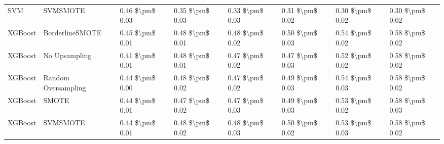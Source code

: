 \begin{tabular}{llllllll}
                            SVM &                      SVMSMOTE & 0.46 \$\textbackslash pm\$ 0.03 &           0.35 \$\textbackslash pm\$ 0.03 &       0.33 \$\textbackslash pm\$ 0.03 &        0.31 \$\textbackslash pm\$ 0.02 &                         0.30 \$\textbackslash pm\$ 0.02 &     0.30 \$\textbackslash pm\$ 0.02 \\
                        XGBoost &               BorderlineSMOTE & 0.45 \$\textbackslash pm\$ 0.01 &           0.48 \$\textbackslash pm\$ 0.01 &       0.48 \$\textbackslash pm\$ 0.02 &        0.50 \$\textbackslash pm\$ 0.03 &                         0.54 \$\textbackslash pm\$ 0.02 &     0.58 \$\textbackslash pm\$ 0.02 \\
                        XGBoost &                 No Upsampling & 0.41 \$\textbackslash pm\$ 0.01 &           0.48 \$\textbackslash pm\$ 0.01 &       0.47 \$\textbackslash pm\$ 0.02 &        0.47 \$\textbackslash pm\$ 0.03 &                         0.52 \$\textbackslash pm\$ 0.02 &     0.58 \$\textbackslash pm\$ 0.02 \\
                        XGBoost &           Random Oversampling & 0.44 \$\textbackslash pm\$ 0.00 &           0.48 \$\textbackslash pm\$ 0.02 &       0.47 \$\textbackslash pm\$ 0.02 &        0.49 \$\textbackslash pm\$ 0.03 &                         0.54 \$\textbackslash pm\$ 0.03 &     0.58 \$\textbackslash pm\$ 0.02 \\
                        XGBoost &                         SMOTE & 0.44 \$\textbackslash pm\$ 0.01 &           0.47 \$\textbackslash pm\$ 0.02 &       0.47 \$\textbackslash pm\$ 0.03 &        0.49 \$\textbackslash pm\$ 0.03 &                         0.53 \$\textbackslash pm\$ 0.02 &     0.58 \$\textbackslash pm\$ 0.03 \\
                        XGBoost &                      SVMSMOTE & 0.44 \$\textbackslash pm\$ 0.01 &           0.48 \$\textbackslash pm\$ 0.02 &       0.48 \$\textbackslash pm\$ 0.03 &        0.50 \$\textbackslash pm\$ 0.02 &                         0.53 \$\textbackslash pm\$ 0.03 &     0.58 \$\textbackslash pm\$ 0.02 \\
\bottomrule
\end{tabular}

